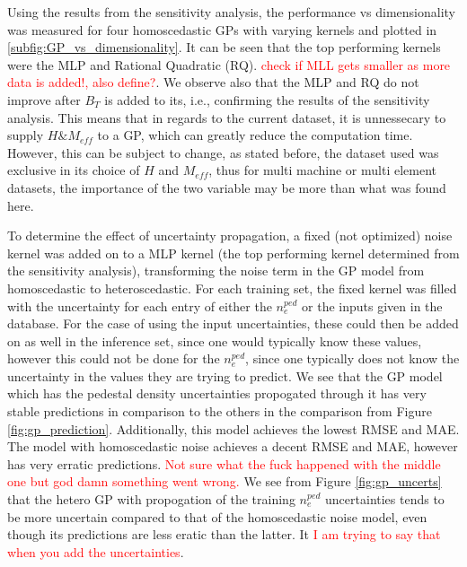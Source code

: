 \documentclass[a4paper, twoside, final, 12pt]{article}
\begin{document}
{Using the results from the sensitivity analysis, the performance vs dimensionality was measured for four homoscedastic GPs with varying kernels and plotted in \ref{subfig:GP_vs_dimensionality}. It can be seen that the top performing kernels were the MLP and Rational Quadratic (RQ). \textcolor{red}{check if MLL gets smaller as more data is added!, also define?}. We observe also that the MLP and RQ do not improve after $B_T$ is added to its, i.e., confirming the results of the sensitivity analysis. This means that in regards to the current dataset, it is unnessecary to supply $H \& M_{eff}$ to a GP, which can greatly reduce the computation time. However, this can be subject to change, as stated before, the dataset used was exclusive in its choice of $H$ and $M_{eff}$, thus for multi machine or multi element datasets, the importance of the two variable may be more than what was found here. 

To determine the effect of uncertainty propagation, a fixed (not optimized) noise kernel was added on to a MLP kernel (the top performing kernel determined from the sensitivity analysis), transforming the noise term in the GP model from homoscedastic to heteroscedastic.
For each training set, the fixed kernel was filled with the uncertainty for each entry of either the $n_e^{ped}$ or the inputs given in the database.
For the case of using the input uncertainties, these could then be added on as well in the inference set, since one would typically know these values, however this could not be done for the $n_e^{ped}$, since one typically does not know the uncertainty in the values they are trying to predict.
We see that the GP model which has the pedestal density uncertainties propogated through it has very stable predictions in comparison to the others in the comparison from Figure \ref{fig:gp_prediction}. Additionally, this model achieves the lowest RMSE and MAE. The model with homoscedastic noise achieves a decent RMSE and MAE, however has very erratic predictions. \textcolor{red}{Not sure what the fuck happened with the middle one but god damn something went wrong.} 
We see from Figure \ref{fig:gp_uncerts} that the hetero GP with propogation of the training $n_e^{ped}$ uncertainties tends to be more uncertain compared to that of the homoscedastic noise model, even though its predictions are less eratic than the latter. It 
\textcolor{red}{I am trying to say that when you add the uncertainties}. 

}
\end{document}
